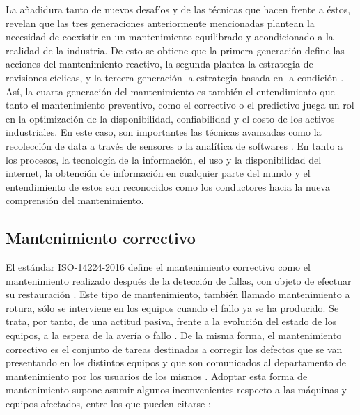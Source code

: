 La añadidura tanto de nuevos desafíos y de las técnicas que hacen frente a éstos, revelan que  las tres generaciones anteriormente mencionadas plantean la necesidad de coexistir en un mantenimiento equilibrado y acondicionado a la realidad de la industria. De esto se obtiene que la primera generación define las acciones del mantenimiento reactivo, la segunda plantea la estrategia de revisiones cíclicas, y la tercera generación la estrategia basada en la condición \parencite{hide2013}.
Así, la cuarta generación del mantenimiento es también el entendimiento que tanto el mantenimiento preventivo, como el correctivo o el predictivo juega un rol en la optimización de la disponibilidad, confiabilidad y el costo de los activos industriales. En este caso, son importantes las técnicas avanzadas como la recolección de data a través de sensores o la analítica de softwares \parencite{houle2016}.
En tanto a los procesos, la tecnología de la información, el uso y la disponibilidad del internet, la obtención de información en cualquier parte del mundo y el entendimiento de estos son reconocidos como los conductores hacia la nueva comprensión del mantenimiento.


\subsection{Mantenimiento correctivo}

El estándar ISO-14224-2016 define el mantenimiento correctivo como el mantenimiento realizado después de la detección de fallas, con objeto de efectuar su restauración \parencite{iso2016}. Este tipo de mantenimiento, también llamado mantenimiento a rotura, sólo se interviene en los equipos cuando el fallo ya se ha producido. Se trata, por tanto, de una actitud pasiva, frente a la evolución del estado de los equipos, a la espera de la avería o fallo \parencite{gomez1998}. De la misma forma, el mantenimiento correctivo es el conjunto de tareas destinadas a corregir los defectos que se van presentando en los distintos equipos y que son comunicados al departamento de mantenimiento por los usuarios de los mismos \parencite{garcia2010}.
Adoptar esta forma de mantenimiento supone asumir algunos inconvenientes respecto a las máquinas y equipos afectados, entre los que pueden citarse \parencite{gomez1998}:\\

